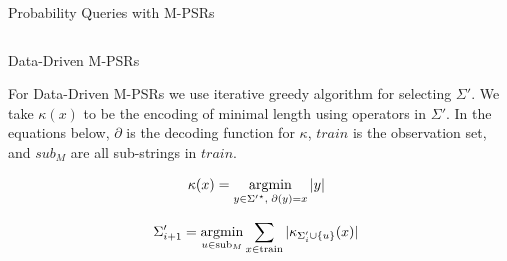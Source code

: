 \documentclass[final]{beamer}
\newlength{\twocolwid}
\begin{document}
\begin{frame}[t]
\begin{columns}[t]
\begin{column}{\twocolwid}
\begin{columns}[t,totalwidth=\twocolwid]
\begin{column}{\twocolwid}
\begin{block}{Probability Queries with M-PSRs}

\end{block}
\end{column} %
\end{columns} %





\begin{block}{Data-Driven M-PSRs}

For Data-Driven M-PSRs we use iterative greedy algorithm for selecting $\Sigma'$. We take $\kappa(x)$ to be the encoding of minimal length using operators in $\Sigma'$. In the equations below, $\partial$ is the decoding function for $\kappa$, $train$ is the observation set, and $sub_M$ are all sub-strings in $train$.

\begin{equation*}
\kappa(x) = \operatorname*{\rm argmin}_{y \in {\Sigma'}^\star, \; \partial(y) = x} |y| \enspace
\end{equation*}

\begin{equation*}
\Sigma'_{i+1} = \operatorname*{\rm argmin}_{u \in \mathrm{sub}_M} \sum_{x \in \mathrm{train}} |\kappa_{\Sigma_i' \cup \{u\}}(x)| \enspace
\end{equation*}



\end{block}
\vspace{3ex}

\end{column}


\end{columns}
\end{frame}
\end{document}
